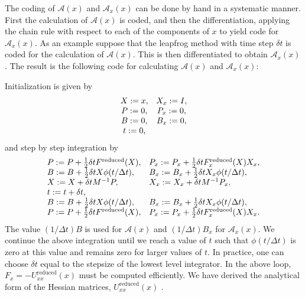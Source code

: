 \documentclass[11pt]{report}
\begin{document}
\begin{appendix}
\begin{itemize}
The coding of $\mathcal{A} (x)$ and
$\mathcal{A}_{x}(x)$ can be done by hand in a systematic
manner. First the calculation of $\mathcal{A}(x)$ is coded, and then
the differentiation, applying the chain rule with respect to each of
the components of $x$ to yield code for $\mathcal{A}_{x}(x)$. As an
example suppose that the leapfrog method with time step $\delta t$ is
coded for the calculation of $\mathcal{A}(x)$. This is then
differentiated to obtain $\mathcal{A}_{x}(x)$.  The result is the
following code for calculating $\mathcal{A}(x)$ and
$\mathcal{A}_{x}(x)$:

Initialization is given by
\begin{equation}
\begin{array}[c]{cc}
X:=x, & X_{x}:=I,\\
P:=0, & P_{x}:=0,\\
B:=0, & B_{x}:=0, \\
t:=0, & 
\end{array}
\end{equation}
and step by step integration by
\begin{equation}
\begin{array}[c]{ll}
P:=P+\frac{1}{2}\delta tF^{\mathrm{reduced}}(X), & P_{x}:=P_{x}+\frac{1}
{2}\delta tF_{x}^{\mathrm{reduced}}(X)X_{x},\\
B:=B+\frac{1}{2}\delta tX\phi(t/\Delta t), 
& B_{x}:=B_{x}+\frac{1}{2}\delta tX_{x} \phi(t/\Delta t),\\
X:=X+\delta tM^{-1}P, & X_{x}:=X_{x}+\delta tM^{-1}P_{x},\\
t:= t+\delta t, & \\
B:=B+\frac{1}{2}\delta tX\phi(t/\Delta t), 
& B_{x}:=B_{x}+\frac{1}{2}\delta tX_{x}\phi(t/\Delta t),\\
P:=P+\frac{1}{2}\delta tF^{\mathrm{reduced}}(X), & P_{x}:=P_{x}+\frac{1}
{2}\delta tF_{x}^{\mathrm{reduced}}(X)X_{x}.
\end{array}
\end{equation}
The value $(1/\Delta t)B$ is used for $\mathcal{A}(x)$ and $(1/\Delta
t)B_{x}$ for $\mathcal{A}_{x}(x)$. We continue the above integration
until we reach a value of $t$ such that $\phi(t/\Delta t)$ is zero at
this value and remains zero for larger values of $t.$ In practice, one
can choose $\delta t$ equal to the stepsize of the lowest
level integrator. 
In the above loop, $F_x = - U^\mathrm{reduced}_{xx}(x)$ must be
computed efficiently. We have derived the
analytical form of the Hessian matrices, $U^\mathrm{reduced}_{xx}(x)$ \cite{IzMa01}.



\end{itemize}
\end{appendix}
\end{document}
